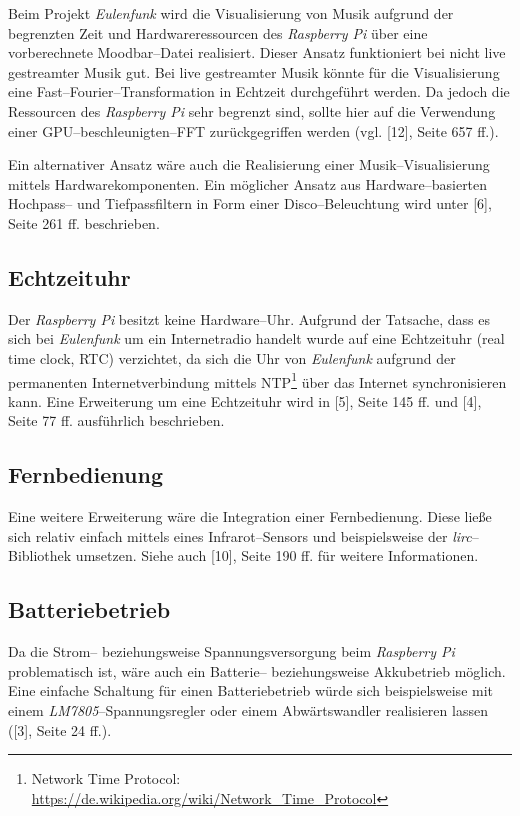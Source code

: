 \documentclass[11pt,ngerman,toc=listof,index=totoc]{scrreprt}
\begin{document}
Beim Projekt \emph{Eulenfunk} wird die Visualisierung von Musik aufgrund
der begrenzten Zeit und Hardwareressourcen des \emph{Raspberry Pi }über
eine vorberechnete Moodbar--Datei realisiert. Dieser Ansatz funktioniert
bei nicht live gestreamter Musik gut. Bei live gestreamter Musik könnte
für die Visualisierung eine Fast--Fourier--Transformation in Echtzeit
durchgeführt werden. Da jedoch die Ressourcen des \emph{Raspberry Pi}
sehr begrenzt sind, sollte hier auf die Verwendung einer
GPU--beschleunigten--FFT zurückgegriffen werden (vgl. {[}12{]}, Seite
657 ff.).

Ein alternativer Ansatz wäre auch die Realisierung einer
Musik--Visualisierung mittels Hardwarekomponenten. Ein möglicher Ansatz
aus Hardware--basierten Hochpass-- und Tiefpassfiltern in Form einer
Disco--Beleuchtung wird unter {[}6{]}, Seite 261 ff. beschrieben.

\subsection{Echtzeituhr}\label{echtzeituhr}

Der \emph{Raspberry Pi} besitzt keine Hardware--Uhr. Aufgrund der
Tatsache, dass es sich bei \emph{Eulenfunk} um ein Internetradio handelt
wurde auf eine Echtzeituhr (real time clock, RTC) verzichtet, da sich
die Uhr von \emph{Eulenfunk} aufgrund der permanenten Internetverbindung
mittels NTP\footnote{Network Time Protocol:
  \url{https://de.wikipedia.org/wiki/Network_Time_Protocol}} über das
Internet synchronisieren kann. Eine Erweiterung um eine Echtzeituhr wird
in {[}5{]}, Seite 145 ff. und {[}4{]}, Seite 77 ff. ausführlich
beschrieben.

\subsection{Fernbedienung}\label{fernbedienung}

Eine weitere Erweiterung wäre die Integration einer Fernbedienung. Diese
ließe sich relativ einfach mittels eines Infrarot--Sensors und
beispielsweise der \emph{lirc}--Bibliothek umsetzen. Siehe auch
{[}10{]}, Seite 190 ff. für weitere Informationen.

\subsection{Batteriebetrieb}\label{batteriebetrieb}

Da die Strom-- beziehungsweise Spannungsversorgung beim \emph{Raspberry
Pi} problematisch ist, wäre auch ein Batterie-- beziehungsweise
Akkubetrieb möglich. Eine einfache Schaltung für einen Batteriebetrieb
würde sich beispielsweise mit einem \emph{LM7805}--Spannungsregler oder
einem Abwärtswandler realisieren lassen ({[}3{]}, Seite 24 ff.).
\end{document}
